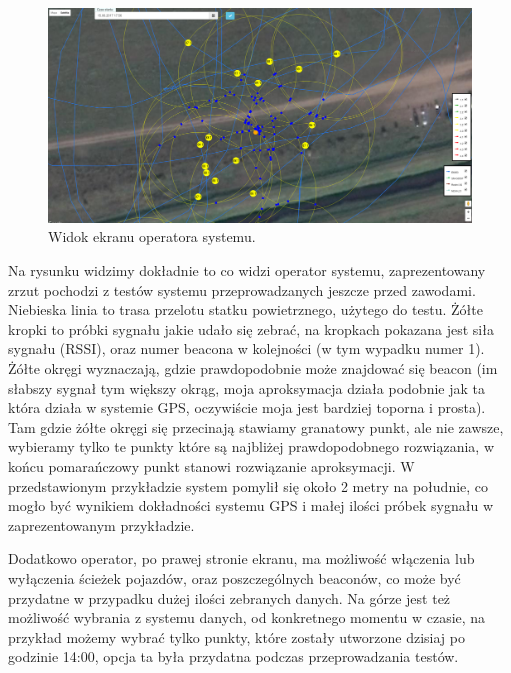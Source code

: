 \begin{figure}[!th]
    \centering
    \includegraphics[width=15cm]{zalaczniki/obrazy/klient.png}
    \caption{Widok ekranu operatora systemu.}
    \label{fig:klient}
\end{figure}

Na rysunku widzimy dokładnie to co widzi operator systemu, zaprezentowany zrzut pochodzi z testów systemu przeprowadzanych jeszcze przed zawodami. Niebieska linia to trasa przelotu statku powietrznego, użytego do testu. Żółte kropki to próbki sygnału jakie udało się zebrać, na kropkach pokazana jest siła sygnału (RSSI), oraz numer beacona w kolejności (w tym wypadku numer 1). Żółte okręgi wyznaczają, gdzie prawdopodobnie może znajdować się beacon (im słabszy sygnał tym większy okrąg, moja aproksymacja działa podobnie jak ta która działa w systemie GPS, oczywiście moja jest bardziej toporna i prosta). Tam gdzie żółte okręgi się przecinają stawiamy granatowy punkt, ale nie zawsze, wybieramy tylko te punkty które są najbliżej prawdopodobnego rozwiązania, w końcu pomarańczowy punkt stanowi rozwiązanie aproksymacji. W przedstawionym przykładzie system pomylił się około 2 metry na południe, co mogło być wynikiem dokładności systemu GPS i małej ilości próbek sygnału w zaprezentowanym przykładzie.

Dodatkowo operator, po prawej stronie ekranu, ma możliwość włączenia lub wyłączenia ścieżek pojazdów, oraz poszczególnych beaconów, co może być przydatne w przypadku dużej ilości zebranych danych. Na górze jest też możliwość wybrania z systemu danych, od konkretnego momentu w czasie, na przykład możemy wybrać tylko punkty, które zostały utworzone dzisiaj po godzinie 14:00, opcja ta była przydatna podczas przeprowadzania testów.


